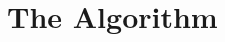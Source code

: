 \documentclass[sigconf]{acmart}
\begin{document}
  
  






\section{The Algorithm} \label{algorithm}
\end{document}

